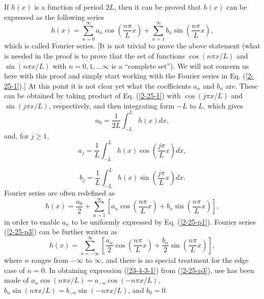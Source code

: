 \documentclass{article}
\begin{document}
If $h (x)$ is a function of period $2 L$, then it can be proved that $h (x)$
can be expressed as the following series
\begin{equation}
  \label{2-25-1} h (x) = \sum_{n = 0}^{\infty} a_n \cos \left( \frac{n \pi}{L}
  x \right) + \sum_{n = 1}^{\infty} b_n \sin \left( \frac{n \pi}{L} x \right),
\end{equation}
which is called Fourier series. [It is not trivial to prove the above
statement (what is needed in the proof is to prove that the set of functions
$\cos (n \pi x / L)$ and $\sin (n \pi x / L)$ with $n = 0, 1, \ldots \infty$
is a ``complete set''{\cite{snieder1994}}). We will not concern us here with
this proof and simply start working with the Fourier series in Eq.
(\ref{2-25-1}).] At this point it is not clear yet what the coefficients $a_n$
and $b_n$ are. These can be obtained by taking product of Eq. (\ref{2-25-1})
with $\cos (j \pi x / L)$ and $\sin (j \pi x / L)$, respectively, and then
integrating form $- L$ to $L$, which gives
\begin{equation}
  a_0 = \frac{1}{2 L} \int_{- L}^L h (x) d x,
\end{equation}
and, for $j \geqslant 1$,
\begin{equation}
  \label{2-25-p1} a_j = \frac{1}{L} \int_{- L}^L h (x) \cos \left( \frac{j
  \pi}{L} x \right) d x,
\end{equation}

\begin{equation}
  \label{2-25-p1m} b_j = \frac{1}{L} \int_{- L}^L h (x) \sin \left( \frac{j
  \pi}{L} x \right) d x.
\end{equation}
Fourier series are often redefined as
\begin{equation}
  \label{2-25-p3} h (x) = \frac{a_0}{2} + \sum_{n = 1}^{\infty} \left[ a_n
  \cos \left( \frac{n \pi}{L} x \right) + b_n \sin \left( \frac{n \pi}{L} x
  \right) \right],
\end{equation}
in order to enable $a_n$ to be uniformly expressed by Eq. (\ref{2-25-p1}).
Fourier series (\ref{2-25-p3}) can be further written as
\begin{equation}
  \label{23-4-3-1} h (x) = \sum_{n = - \infty}^{\infty} \left[ \frac{a_n}{2}
  \cos \left( \frac{n \pi}{L} x \right) + \frac{b_n}{2} \sin \left( \frac{n
  \pi}{L} x \right) \right],
\end{equation}
where $n$ ranges from $- \infty$ to $\infty$, and there is no special
treatment for the edge case of $n = 0$. In obtaining expression
(\ref{23-4-3-1}) from (\ref{2-25-p3}), use has been made of $a_n \cos (n \pi x
/ L) = a_{- n} \cos (- n \pi x / L)$, $b_n \sin (n \pi x / L) = b_{- n} \sin
(- n \pi x / L)$, and $b_0 = 0$.
\end{document}
